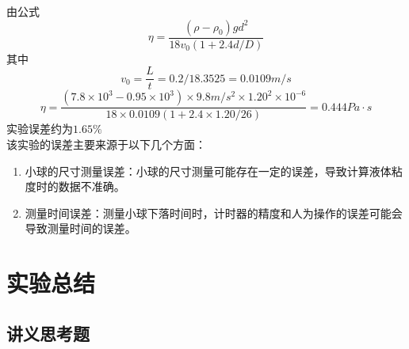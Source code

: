 \documentclass[UTF8]{article}
\theoremstyle{MyLineTheoremStyle} %
\theoremstyle{MyBlockTheoremStyle} %
\theoremstyle{MySubsubsectionStyle} %
\begin{document}
由公式
\[
\eta = \frac{(\rho - \rho_0)gd^2}{18v_0(1+2.4d/D)}
\]
其中
\[
v_0 = \frac{L}{t}=0.2/18.3525=0.0109m/s
\]
\[
\eta = \frac{(7.8\times 10^3-0.95\times 10^3)\times 9.8m/s^2\times 1.20^2\times 10^{-6}}{18\times 0.0109(1+2.4\times 1.20/26)}=0.444Pa\cdot s
\]
实验误差约为$1.65\%$\\
该实验的误差主要来源于以下几个方面：
\begin{enumerate}
    \item 小球的尺寸测量误差：小球的尺寸测量可能存在一定的误差，导致计算液体粘度时的数据不准确。
    \item 测量时间误差：测量小球下落时间时，计时器的精度和人为操作的误差可能会导致测量时间的误差。
\end{enumerate}





\section{实验总结}

\subsection{讲义思考题}
\end{document}
